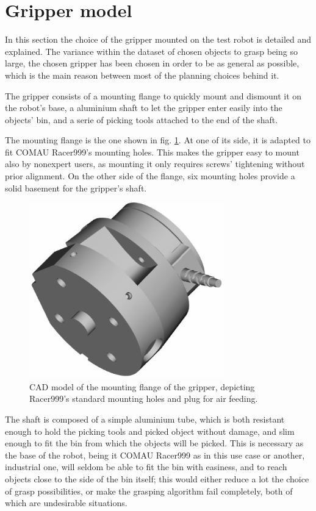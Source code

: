 \section{Gripper model}
In this section the choice of the gripper mounted on the test robot is detailed
and explained. The variance within the dataset of chosen objects to grasp being
so large, the chosen gripper has been chosen in order to be as general as
possible, which is the main reason between most of the planning choices behind
it.

The gripper consists of a mounting flange to quickly mount and
dismount it on the robot's base, a aluminium shaft to let the gripper enter
easily into the objects' bin, and a serie of picking tools attached to the end
of the shaft.

The mounting flange is the one shown in fig. \ref{fig:mounting-flange}. At one
of its side, it is adapted to fit COMAU Racer999's mounting holes. This makes
the gripper easy to mount also by nonexpert users, as mounting it only requires
screws' tightening without prior alignment. On the other side of the flange,
six mounting holes provide a solid basement for the gripper's shaft. 

\begin{figure}[htbp]
  \centering
  \includegraphics[height=3in]{./Graphics/gripper_flange}
  \caption{CAD model of the mounting flange of the gripper, depicting
  Racer999's standard mounting holes and plug for air feeding. \label{fig:mounting-flange}}
\end{figure}

The shaft is composed of a simple aluminium tube, which is both resistant enough
to hold the picking tools and picked object without damage, and slim enough to
fit the bin from which the objects will be picked. This is necessary as the
base of the robot, being it COMAU Racer999 as in this use case or another,
industrial one, will seldom be able to fit the bin with easiness, and to reach
objects close to the side of the bin itself; this would either reduce a lot the
choice of grasp possibilities, or make the grasping algorithm fail completely,
both of which are undesirable situations.

